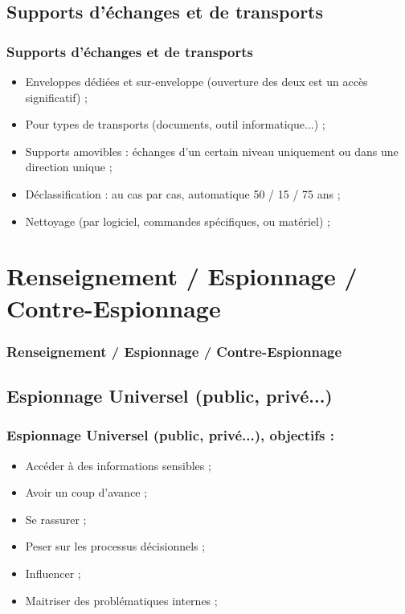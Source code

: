 \documentclass[slidetop,11pt]{beamer}
\begin{document}
\subsection{Supports d'{\'e}changes et de transports}
\begin{frame}
	\frametitle{Supports d'{\'e}changes et de transports}
	\begin{itemize}
		\item Enveloppes d{\'e}di{\'e}es et sur-enveloppe (ouverture des deux est un acc{\`e}s significatif) ; 
		\item Pour types de transports (documents, outil informatique...) ; 
		\item Supports amovibles : {\'e}changes d'un certain niveau uniquement ou dans une direction unique ;
		\item D{\'e}classification : au cas par cas, automatique 50 / 15 / 75 ans ; 
		\item Nettoyage (par logiciel, commandes sp{\'e}cifiques, ou mat{\'e}riel) ; 
	\end{itemize}
\end{frame}

\section{Renseignement / Espionnage / Contre-Espionnage}
\begin{frame}
	\frametitle{Renseignement / Espionnage / Contre-Espionnage}
	\tableofcontents[sections=5,currentsection,subsectionstyle=show/shaded/hide] %
\end{frame}

\subsection{Espionnage Universel (public, priv{\'e}...)}
\begin{frame}
	\frametitle{Espionnage Universel (public, priv{\'e}...), objectifs : }
	\begin{itemize}
		\item Acc{\'e}der {\`a} des informations sensibles ; 
		\item Avoir un coup d'avance ; 
		\item Se rassurer ; 
		\item Peser sur les processus d{\'e}cisionnels ; 
		\item Influencer ; 
		\item Maitriser des probl{\'e}matiques internes ; 
	\end{itemize}
\end{frame}
\end{document}
